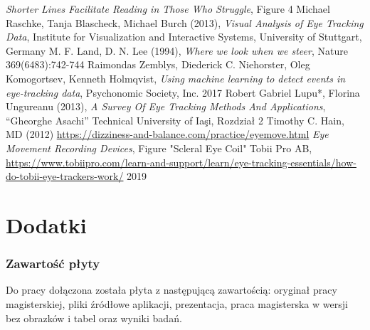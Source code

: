\documentclass[14pt,a4paper,twoside,openright,titlepage]{extbook}
\begin{document}
\begin{thebibliography}{99}
            \emph{Shorter Lines Facilitate Reading in Those Who Struggle},
            Figure 4
            Michael Raschke, Tanja Blascheck, Michael Burch (2013),
            \emph{Visual Analysis of Eye Tracking Data},
            Institute for Visualization and Interactive Systems, University of Stuttgart, Germany
            M. F. Land, D. N. Lee (1994),
            \emph{Where we look when we steer},
            Nature 369(6483):742-744
            Raimondas Zemblys, Diederick C. Niehorster, Oleg Komogortsev, Kenneth Holmqvist,
            \emph{Using machine learning to detect events in eye-tracking data},
            Psychonomic Society, Inc. 2017
            Robert Gabriel Lupu*, Florina Ungureanu (2013),
            \emph{A Survey Of Eye Tracking Methods And Applications},
            “Gheorghe Asachi” Technical University of Iaşi,
            Rozdział 2
            Timothy C. Hain, MD (2012)
            \url{https://dizziness-and-balance.com/practice/eyemove.html}
            \emph{Eye Movement Recording Devices}, Figure "Scleral Eye Coil"
            Tobii Pro AB,\\
            \url{https://www.tobiipro.com/learn-and-support/learn/eye-tracking-essentials/how-do-tobii-eye-trackers-work/}
            2019
    \end{thebibliography}
    \part*{Dodatki}
        \section*{Zawartość płyty}
            Do pracy dołączona została płyta z następującą zawartością: oryginał pracy magisterskiej, pliki źródłowe aplikacji, prezentacja, praca magisterska w wersji bez obrazków i tabel oraz wyniki badań.
        \listoffigures
        \listoftables
        \lstlistoflistings
\end{document}
